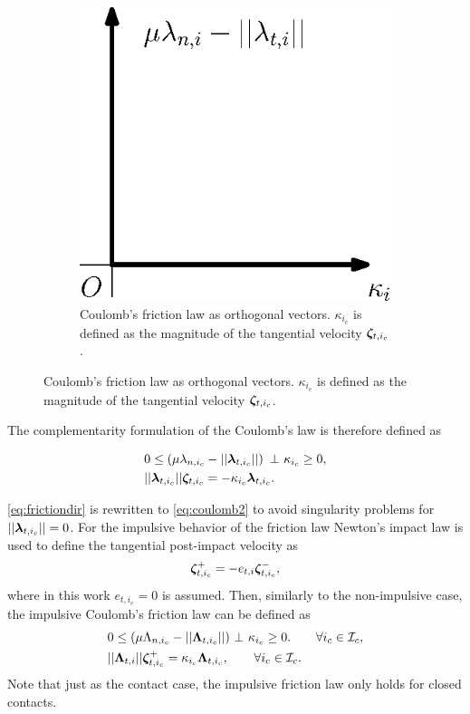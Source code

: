 \documentclass[../DC2017114Bouma.tex]{subfiles}
\begin{document}
\begin{figure}[h]
\begin{subfigure}{0.3\textwidth}
\includegraphics[width=\linewidth]{coulombort.eps}\caption{Coulomb's friction law as orthogonal vectors. $\kappa_{i_c}$ is defined as the magnitude of the tangential velocity $\boldsymbol{\zeta}_{t,i_c}$.}\label{fig:coulombort}
\end{subfigure}
\end{figure}

The complementarity formulation of the Coulomb's law is therefore defined as

\begin{align}
&0\leq \left(\mu\lambda_{n,i_c} - ||\lambdab_{t,i_c}||\right)\ \bot\ \kappa_{i_c} \geq 0,\label{eq:coulomb1}\\
&||\lambdab_{t,i_c}||\zetab_{t,i_c} = -\kappa_{i_c}\lambdab_{t,i_c}.\label{eq:coulomb2}
\end{align}

\eqref{eq:frictiondir} is rewritten to \eqref{eq:coulomb2} to avoid singularity problems for $||\boldsymbol{\lambda}_{t,i_c}|| = 0$. For the impulsive behavior of the friction law Newton's impact law is used to define the tangential post-impact velocity as
\begin{align}
\boldsymbol{\zeta}^+_{t,i_c} = -e_{t,i}\boldsymbol{\zeta}^-_{t,i_c},
\end{align}
where in this work $e_{t,i_c}=0$ is assumed. Then, similarly to the non-impulsive case, the impulsive Coulomb's friction law can be defined as
\begin{align}
&0 \leq (\mu\Lambda_{n,i_c} - ||\Lambdab_{t,i_c}||)\ \bot\ \kappa_{i_c} \geq 0. \qquad \forall i_c\in\Ic_c,\label{eq:coulombimp1}\\
&||\Lambdab_{t,i}||\zetab_{t,i_c}^+ = \kappa_{i_c}\Lambdab_{t,i_c},\qquad \forall i_c\in\Ic_c.\label{eq:coulombimp2}
\end{align}
Note that just as the contact case, the impulsive friction law only holds for closed contacts.
\end{document}

